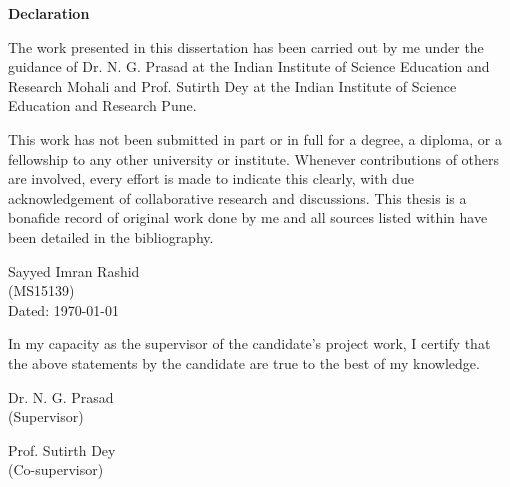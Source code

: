 \cleardoublepage
\begin{center}
\Large  {\bf Declaration }
\end{center}
\vspace{0.5in}
The work presented in this dissertation has been carried out by me under the guidance of Dr. N. G. Prasad at the Indian Institute of Science Education and Research Mohali and Prof. Sutirth Dey at the Indian Institute of Science Education and Research Pune.

\bigskip

\noindent This work has not been submitted in part or in full for a degree, a diploma, or a fellowship to any other university or institute. Whenever contributions of others are involved, every effort is made to indicate this clearly, with due acknowledgement of collaborative research and discussions. This thesis is a bonafide record of original work done by me and all sources listed within have been detailed in the bibliography.

\vspace{.6in}
\begin{flushright}
Sayyed Imran Rashid\\
(MS15139)\\
Dated: \today
\end{flushright}

\vfill

\noindent In my capacity as the supervisor of the candidate’s project work, I certify that the above statements by the candidate are true to the best of my knowledge.
\vspace{.5in}
\begin{center}
\parbox[t]{0.45\linewidth}{
    \centering
    Dr. N. G. Prasad\\
    (Supervisor)}
\parbox[t]{0.45\linewidth}{
    \centering
    Prof. Sutirth Dey\\
    (Co-supervisor)}
\end{center}
\pagebreak
